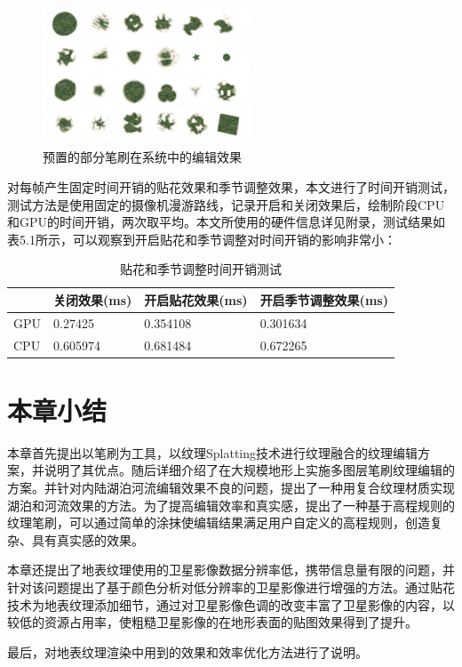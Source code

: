 \begin{figure}[H]
    \centering
    \includegraphics[height=4.2cm,width=6.2cm]{figures/brushEffect.jpg}
    \caption{预置的部分笔刷在系统中的编辑效果}
\end{figure}

对每帧产生固定时间开销的贴花效果和季节调整效果，本文进行了时间开销测试，测试方法是使用固定的摄像机漫游路线，记录开启和关闭效果后，绘制阶段CPU和GPU的时间开销，两次取平均。本文所使用的硬件信息详见附录，测试结果如表5.1所示，可以观察到开启贴花和季节调整对时间开销的影响非常小：
\begin{table}[h]
\caption{贴花和季节调整时间开销测试}  
\begin{tabularx}{15cm}{llll}  
\hline  
&关闭效果(ms)&开启贴花效果(ms)&开启季节调整效果(ms)\\
\hline
GPU& 0.27425&0.354108&0.301634 \\
\hline
CPU&0.605974&0.681484&0.672265    \\
\end{tabularx}  
\end{table}

\section{本章小结}
本章首先提出以笔刷为工具，以纹理Splatting技术进行纹理融合的纹理编辑方案，并说明了其优点。随后详细介绍了在大规模地形上实施多图层笔刷纹理编辑的方案。并针对内陆湖泊河流编辑效果不良的问题，提出了一种用复合纹理材质实现湖泊和河流效果的方法。为了提高编辑效率和真实感，提出了一种基于高程规则的纹理笔刷，可以通过简单的涂抹使编辑结果满足用户自定义的高程规则，创造复杂、具有真实感的效果。 \par
本章还提出了地表纹理使用的卫星影像数据分辨率低，携带信息量有限的问题，并针对该问题提出了基于颜色分析对低分辨率的卫星影像进行增强的方法。通过贴花技术为地表纹理添加细节，通过对卫星影像色调的改变丰富了卫星影像的内容，以较低的资源占用率，使粗糙卫星影像的在地形表面的贴图效果得到了提升。\par
最后，对地表纹理渲染中用到的效果和效率优化方法进行了说明。